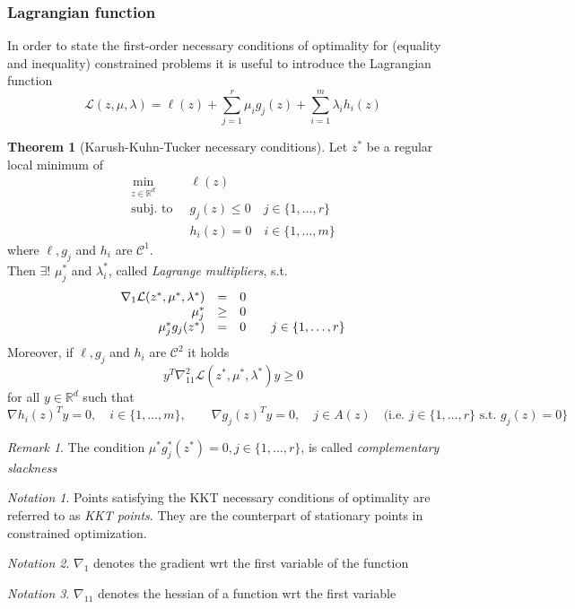 \documentclass[openany]{book}
\newcommand{\R}{\mathbb{R}} %
\theoremstyle{definition}
\newtheorem{theorem}{Theorem}[section] %
\theoremstyle{remark}
\newtheorem*{remark}{Remark} %
\newtheorem*{notation}{Notation} %
\begin{document}
\subsubsection{Lagrangian function}
In order to state the first-order necessary conditions of optimality for (equality and inequality) constrained problems it is useful to introduce the Lagrangian function 
\[
    \mathcal{L}(z,\mu,\lambda)=\ell(z)+\displaystyle\sum_{j=1}^{r}\mu_ig_j(z) + \displaystyle\sum_{i=1}^{m}\lambda_i h_i(z)
\]
\begin{theorem}[Karush-Kuhn-Tucker necessary conditions]
    Let $z^*$ be a regular local minimum of 
    \begin{align*}
        \min_{z\in\R^d}\  &\ell(z) \\
        \text{subj. to }\  & g_j(z)\leq 0 \quad j\in\{1,\dots,r\}\\
        & h_i(z)=0 \quad i\in\{1,\dots,m\}
    \end{align*}
    where $\ell,g_j$ and $h_i$ are $\mathcal{C}^1$. \\
    Then $\exists!$  $\mu_j^*$ and $\lambda_i^*$, called \emph{Lagrange multipliers}, s.t.
    \[
        \begin{array}{ r c l}
            \nabla_1\mathcal{L}(z^*,\mu^*,\lambda^*) & = & 0 \\             \mu_j^* & \geq & 0 \\
            \mu^*_jg_j(z^*) & = & 0 \qquad j\in \{1,\dots,r\} 
        \end{array}
    \]
    Moreover, if $\ell, g_j$ and $h_i$ are $\mathcal{C}^2$ it holds
    \[
        y^T\nabla_{11}^2\mathcal{L}(z^*,\mu^*,\lambda^*)y \geq 0
    \]
    for all $y\in\R^d$ such that
    \[
    \nabla h_i(z)^Ty = 0, \quad i\in\{1,\dots,m\}, \qquad \nabla g_j(z)^Ty = 0, \quad j\in A(z) \quad \text{(i.e. } j\in\{1,\dots,r\} \text{ s.t. } g_j(z)=0\}
\]
\end{theorem}
\begin{remark}
    The condition $\mu^*g_j^*(z^*)=0,j\in\{1,\dots,r\}$, is called \emph{complementary slackness}
\end{remark}
\begin{notation}
    Points satisfying the KKT necessary conditions of optimality are referred to as \emph{KKT points}. They are the counterpart of stationary points in constrained optimization.
\end{notation}
\begin{notation}
    $\nabla_1$ denotes the gradient wrt the first variable of the function
\end{notation}
\begin{notation}
    $\nabla_{11}$ denotes the hessian of a function wrt the first variable
\end{notation}
\end{document}

